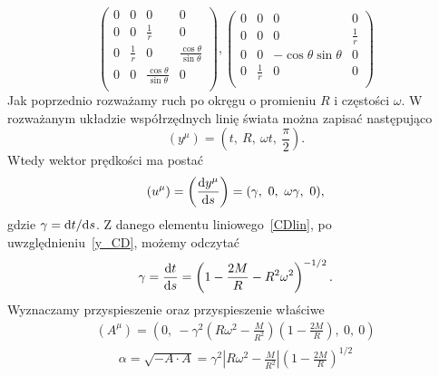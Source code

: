 $$
\left(
\begin{array}{cccc}
 0 & 0 & 0 & 0 \\
 0 & 0 & \frac{1}{r} & 0 \\
 0 & \frac{1}{r} & 0 & \frac{\cos \theta}{\sin\theta}  \\
 0 & 0 &\frac{ \cos \theta }{\sin \theta }  & 0 \\
\end{array}
\right),\left(
\begin{array}{cccc}
 0 & 0 & 0 & 0 \\
 0 & 0 & 0 & \frac{1}{r} \\
 0 & 0 & -\cos \theta\sin \theta  & 0 \\
 0 & \frac{1}{r} & 0 & 0 \\
\end{array}
\right)
$$
Jak poprzednio rozważamy ruch po okręgu o promieniu $R$ i częstości $\omega$.
W rozważanym układzie współrzędnych linię świata można zapisać następująco
\begin{equation}\label{y_CD}
(y^\mu) = \left( t,\ R,\ \omega t,\ \frac{\pi}{2}\right).
\end{equation}
Wtedy wektor prędkości ma postać
\begin{equation}\nonumber
(u^\mu) = \left( \frac{\text{d} y^\mu}{\text{d} s} \right) 
= (\gamma,\ 0,\ \omega\gamma,\ 0),
\end{equation}
gdzie $\gamma = \text{d} t/\text{d} s$. Z danego elementu liniowego~\eqref{CDlin}, 
po uwzględnieniu~\eqref{y_CD}, możemy odczytać 
\begin{align}\nonumber
\gamma = \frac{\text{d} t}{\text{d} s} = 
 \left(1 - \frac{2 M}{R} - R^2\omega^2 \right)^{-1/2}.
\end{align}
Wyznaczamy przyspieszenie oraz przyspieszenie właściwe
\begin{align}\nonumber
(A^\mu) = \left(0,\ -\gamma^2 \left( R\omega^2 - \frac{M}{R^2} \right) 
\left(1-\frac{2M}{R}\right),\ 0,\ 0 \right)
\end{align}
\begin{align}\nonumber
\alpha = \sqrt{-A\cdot A} = \gamma^2 
\left| R\omega^2 - \frac{M}{R^2} \right|
\left( 1-\frac{2M}{R} \right)^{1/2}
\end{align}

